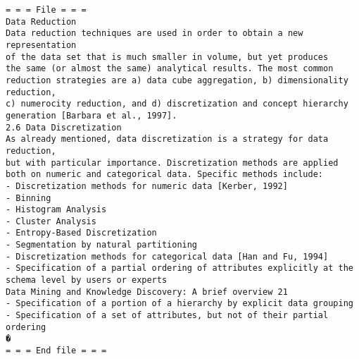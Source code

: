 \begin{lstlisting}[language=Out,]
= = = File = = =
Data Reduction
Data reduction techniques are used in order to obtain a new representation
of the data set that is much smaller in volume, but yet produces
the same (or almost the same) analytical results. The most common
reduction strategies are a) data cube aggregation, b) dimensionality reduction,
c) numerocity reduction, and d) discretization and concept hierarchy
generation [Barbara et al., 1997].
2.6 Data Discretization
As already mentioned, data discretization is a strategy for data reduction,
but with particular importance. Discretization methods are applied
both on numeric and categorical data. Specific methods include:
- Discretization methods for numeric data [Kerber, 1992]
- Binning
- Histogram Analysis
- Cluster Analysis
- Entropy-Based Discretization
- Segmentation by natural partitioning
- Discretization methods for categorical data [Han and Fu, 1994]
- Specification of a partial ordering of attributes explicitly at the
schema level by users or experts
Data Mining and Knowledge Discovery: A brief overview 21
- Specification of a portion of a hierarchy by explicit data grouping
- Specification of a set of attributes, but not of their partial ordering
�
= = = End file = = =


\end{lstlisting}
